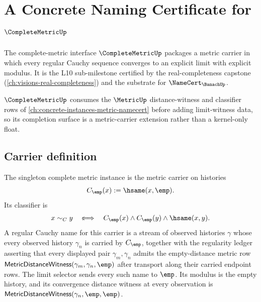 \chapter{A Concrete Naming Certificate for $\CompleteMetricUp$}
\label{ch:concrete-instances-completemetric-namecert}

The complete-metric interface $\CompleteMetricUp$ packages a metric carrier in which every regular Cauchy sequence converges to an explicit limit with explicit modulus. It is the L10 sub-milestone certified by the real-completeness capstone (\autoref{ch:visions-real-completeness}) and the substrate for $\NameCert_{\BanachUp}$.

$\CompleteMetricUp$ consumes the $\MetricUp$ distance-witness and classifier rows of \autoref{ch:concrete-instances-metric-namecert} before adding limit-witness data, so its completion surface is a metric-carrier extension rather than a kernel-only float.

\section{Carrier definition}
\label{sec:completemetric-carrier}

\begin{definition}
\label{def:singleton-complete-metric-instance}
The singleton complete metric instance is the metric carrier on histories
$$
C_{\emp}(x):=\hsame(x,\emp).
$$
Its classifier is
$$
x\sim_C y \quad:\!\!\Longleftrightarrow\quad
C_{\emp}(x)\land C_{\emp}(y)\land \hsame(x,y).
$$
A regular Cauchy name for this carrier is a stream of observed histories
$\gamma$ whose every observed history $\gamma_n$ is carried by $C_{\emp}$,
together with the regularity ledger asserting that every displayed pair
$\gamma_m,\gamma_n$ admits the empty-distance metric row
$\mathsf{MetricDistanceWitness}(\gamma_m,\gamma_n,\emp)$ after transport along
their carried endpoint rows. The limit selector sends every such name to
$\emp$. Its modulus is the empty history, and its convergence distance witness
at every observation is
$\mathsf{MetricDistanceWitness}(\gamma_n,\emp,\emp)$.
\end{definition}

